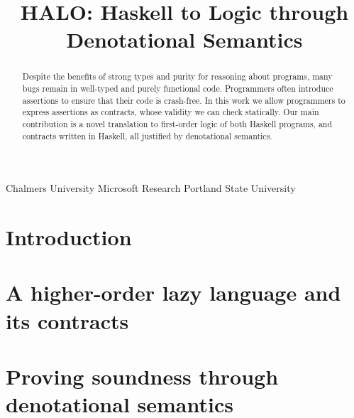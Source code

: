 \documentclass[preprint,nocopyrightspace,draft]{sigplanconf}
\begin{document}
\renewcommand{\Th}{{\cal T}}

\title{HALO: Haskell to Logic through Denotational Semantics}

           {Chalmers University}{}
           {Microsoft Research}{}
           {Portland State University}{}
\maketitle
\makeatactive

\begin{abstract}
Despite the benefits of strong types and purity for reasoning about
programs, many bugs remain in well-typed and purely functional
code.  Programmers often introduce assertions to ensure that their
code is crash-free.  In this work we allow programmers to express
assertions as contracts, whose validity we can check statically.  Our main
contribution is a novel translation to first-order logic 
of both Haskell programs, and contracts written in Haskell,
all justified by denotational semantics.
\end{abstract}



\section{Introduction}\label{s:intro}
  

%   

\section{A higher-order lazy language and its contracts}\label{sect:language}
  

\section{Proving soundness through denotational semantics}
   \label{sect:contracts}\label{ssect:denot}
  
\end{document}

